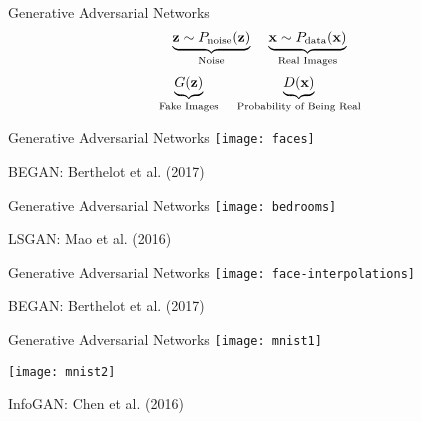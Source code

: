 \begin{slide}{Generative Adversarial Networks}
$$
\underbrace{\mathbf{z} \sim P_{\text{noise}}(\mathbf{z})}_\text{Noise}
\hspace{0.4cm}
\underbrace{\mathbf{x} \sim P_{\text{data}}(\mathbf{x})}_\text{Real Images}
$$
\vspace{0.1cm}
$$
\underbrace{G(\mathbf{z})}_\text{Fake Images}
\hspace{0.4cm}
\underbrace{D(\mathbf{x})}_\text{Probability of Being Real}
$$


\end{slide}

\begin{slide}{Generative Adversarial Networks}
  \texttt{[image: faces]}

  \scriptsize
  BEGAN: Berthelot et al. (2017)
\end{slide}

\begin{slide}{Generative Adversarial Networks}
  \texttt{[image: bedrooms]}

  \scriptsize
  LSGAN: Mao et al. (2016)
\end{slide}

\begin{slide}{Generative Adversarial Networks}
  \texttt{[image: face-interpolations]}

  \scriptsize
  BEGAN: Berthelot et al. (2017)
\end{slide}

\begin{slide}{Generative Adversarial Networks}
  \texttt{[image: mnist1]}

  \texttt{[image: mnist2]}

  \scriptsize
  InfoGAN: Chen et al. (2016)
\end{slide}
